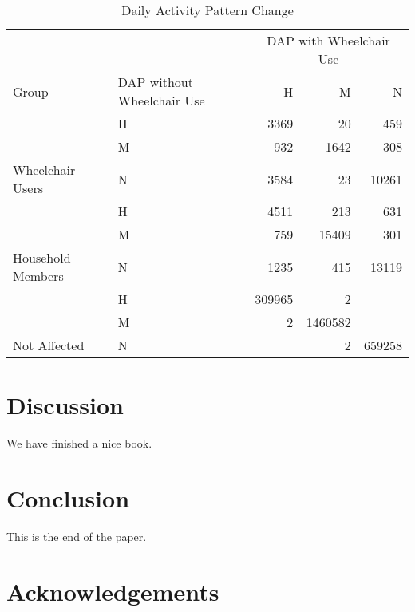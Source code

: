 \documentclass[3p, authoryear, review]{elsarticle} %
\begin{document}
\begin{table}

\caption{\label{tab:dap-summary}Daily Activity Pattern Change}
\centering
\begin{tabular}[t]{llrrr}
\toprule
\multicolumn{1}{c}{} & \multicolumn{1}{c}{} & \multicolumn{3}{c}{DAP with Wheelchair Use} \\
\cmidrule(l{3pt}r{3pt}){3-5}
Group & DAP without Wheelchair Use & H & M & N\\
\midrule
 & H & 3369 & 20 & 459\\

 & M & 932 & 1642 & 308\\

\multirow{-3}{*}{\raggedright\arraybackslash Wheelchair Users} & N & 3584 & 23 & 10261\\
\cmidrule{1-5}
 & H & 4511 & 213 & 631\\

 & M & 759 & 15409 & 301\\

\multirow{-3}{*}{\raggedright\arraybackslash Household Members} & N & 1235 & 415 & 13119\\
\cmidrule{1-5}
 & H & 309965 & 2 & \\

 & M & 2 & 1460582 & \\

\multirow{-3}{*}{\raggedright\arraybackslash Not Affected} & N &  & 2 & 659258\\
\bottomrule
\end{tabular}
\end{table}

\hypertarget{discussion}{%
\section{Discussion}\label{discussion}}

We have finished a nice book.

\hypertarget{conclusion}{%
\section{Conclusion}\label{conclusion}}

This is the end of the paper.

\hypertarget{acks}{%
\section*{Acknowledgements}\label{acks}}
\end{document}
